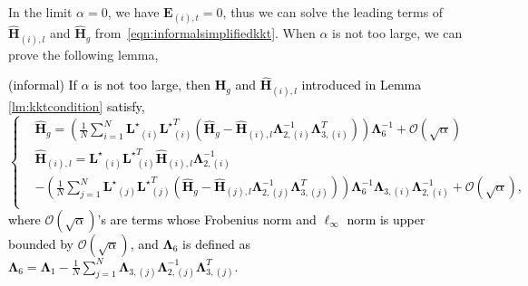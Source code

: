 \documentclass[twoside,11pt]{article}
\newcommand{\revise}[1]{\textcolor{black}{ #1}}
\newcommand{\mO}{\mathcal{O}}
\newcommand{\matE}{\mathbf{E}}
\newcommand{\hmatH}{{\hat{\mathbf{H}}}{}}
\newcommand{\matLst}{{\mathbf{L}^\star}}
\newcommand{\matLambda}{\mathbf{\Lambda}}
\begin{document}
In the limit $\alpha=0$, we have $\matE_{(i),t}=0$, thus we can solve the leading terms of $\hmatH_{(i),l}$ and $\hmatH_{g}$ from~\eqref{eqn:informalsimplifiedkkt}. When $\alpha$ is not too large, we can prove the following lemma,
\revise{
\begin{lemma}
\label{lm:informalhpertuabation}
(informal) If $\alpha$ is not too large, then $\hmatH_g$ and $\hmatH_{(i),l}$ introduced in Lemma \ref{lm:kktcondition} satisfy,
\begin{equation}
\label{eqn:hhatsolutioninformal}
\left\{\begin{aligned}
&\hmatH_{g} = \left(\frac{1}{N}\sum_{i=1}^N\matLst_{(i)}\matLst_{(i)}^T\left(\hmatH_{g}-\hmatH_{(i),l}\matLambda_{2,(i)}^{-1}\matLambda_{3,(i)}^T\right)\right) \matLambda_6^{-1}+\mO(\sqrt{\alpha})\\
&\hmatH_{(i),l} = \matLst_{(i)}\matLst_{(i)}^T \hmatH_{(i),l}\matLambda_{2,(i)}^{-1}\\
&- \left(\frac{1}{N}\sum_{j=1}^N\matLst_{(j)}\matLst_{(j)}^T\left(\hmatH_{g}-\hmatH_{(j),l}\matLambda_{2,(j)}^{-1}\matLambda_{3,(j)}^T\right)\right) \matLambda_6^{-1}\matLambda_{3,(i)}\matLambda_{2,(i)}^{-1}+\mO(\sqrt{\alpha}),\\
\end{aligned}\right. 
\end{equation}
where $\mO(\sqrt{\alpha})$'s are terms whose Frobenius norm and $\ell_{\infty}$ norm is upper bounded by $\mO(\sqrt{\alpha})$, and $\matLambda_{6}$ is defined as $\matLambda_{6} = \matLambda_{1}-\frac{1}{N}\sum_{j=1}^N\matLambda_{3,(j)}\matLambda_{2,(j)}^{-1}\matLambda_{3,(j)}^T$.
\end{lemma}
}
\end{document}
